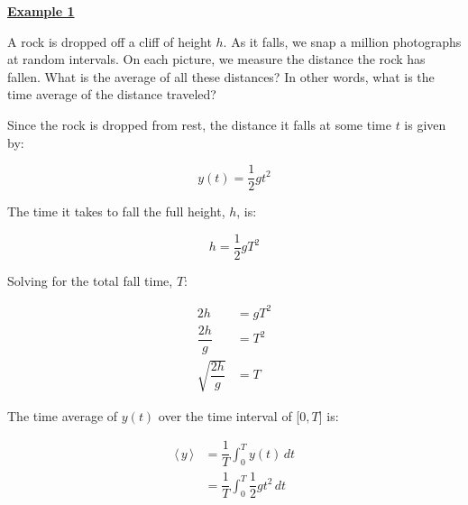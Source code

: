 \clearpage

\textbf{\underline{Example 1}}

A rock is dropped off a cliff of height $h$. As it falls, we snap a million photographs at random intervals.
On each picture, we measure the distance the rock has fallen. What is the average of all these distances? In other
words, what is the time average of the distance traveled?

Since the rock is dropped from rest, the distance it falls at some time $t$ is given by:

\[
  y(t) = \dfrac{1}{2}gt^{2}
\]

The time it takes to fall the full height, $h$, is:

\[
  h = \dfrac{1}{2}gT^{2}
\]

Solving for the total fall time, $T$:

\begin{align*}
  2h &= gT^{2} \\[1.5ex]
  \dfrac{2h}{g} &= T^{2} \\[1.5ex]
  \sqrt{\dfrac{2h}{g}} &= T
\end{align*}

The time average of $y(t)$ over the time interval of [$0, T$] is:

\begin{align*}
  \langle \, y \, \rangle &= \dfrac{1}{T} \int_{0}^{T} y(t) \, dt \\[1.5ex]
  &= \dfrac{1}{T} \int_{0}^{T} \dfrac{1}{2}gt^2 \, dt
\end{align*}
